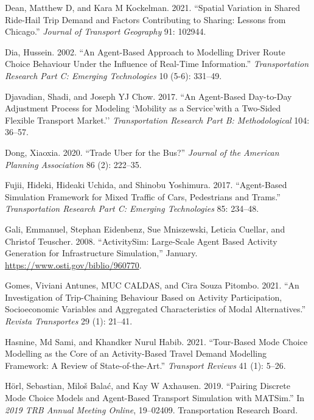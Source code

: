 \documentclass[12pt, oneside, openright]{byuthesis}
\newlength{\cslhangindent}
\newlength{\cslentryspacingunit} %
\newenvironment{CSLReferences}[2] %
 {%
  \setlength{\parindent}{0pt}
  \ifodd #1
  \let\oldpar\par
  \def\par{\hangindent=\cslhangindent\oldpar}
  \fi
  \setlength{\parskip}{#2\cslentryspacingunit}
 }%
 {}
\begin{document}
\begin{CSLReferences}{1}{0}
\leavevmode{}%
Dean, Matthew D, and Kara M Kockelman. 2021. {``Spatial Variation in Shared Ride-Hail Trip Demand and Factors Contributing to Sharing: Lessons from Chicago.''} \emph{Journal of Transport Geography} 91: 102944.

\leavevmode{}%
Dia, Hussein. 2002. {``An Agent-Based Approach to Modelling Driver Route Choice Behaviour Under the Influence of Real-Time Information.''} \emph{Transportation Research Part C: Emerging Technologies} 10 (5-6): 331--49.

\leavevmode{}%
Djavadian, Shadi, and Joseph YJ Chow. 2017. {``An Agent-Based Day-to-Day Adjustment Process for Modeling `Mobility as a Service'with a Two-Sided Flexible Transport Market.''} \emph{Transportation Research Part B: Methodological} 104: 36--57.

\leavevmode{}%
Dong, Xiaoxia. 2020. {``Trade Uber for the Bus?''} \emph{Journal of the American Planning Association} 86 (2): 222--35.

\leavevmode{}%
Fujii, Hideki, Hideaki Uchida, and Shinobu Yoshimura. 2017. {``Agent-Based Simulation Framework for Mixed Traffic of Cars, Pedestrians and Trams.''} \emph{Transportation Research Part C: Emerging Technologies} 85: 234--48.

\leavevmode{}%
Gali, Emmanuel, Stephan Eidenbenz, Sue Mniszewski, Leticia Cuellar, and Christof Teuscher. 2008. {``ActivitySim: Large-Scale Agent Based Activity Generation for Infrastructure Simulation,''} January. \url{https://www.osti.gov/biblio/960770}.

\leavevmode{}%
Gomes, Viviani Antunes, MUC CALDAS, and Cira Souza Pitombo. 2021. {``An Investigation of Trip-Chaining Behaviour Based on Activity Participation, Socioeconomic Variables and Aggregated Characteristics of Modal Alternatives.''} \emph{Revista Transportes} 29 (1): 21--41.

\leavevmode{}%
Hasnine, Md Sami, and Khandker Nurul Habib. 2021. {``Tour-Based Mode Choice Modelling as the Core of an Activity-Based Travel Demand Modelling Framework: A Review of State-of-the-Art.''} \emph{Transport Reviews} 41 (1): 5--26.

\leavevmode{}%
Hörl, Sebastian, Miloš Balać, and Kay W Axhausen. 2019. {``Pairing Discrete Mode Choice Models and Agent-Based Transport Simulation with MATSim.''} In \emph{2019 TRB Annual Meeting Online}, 19--02409. Transportation Research Board.


\end{CSLReferences}
\end{document}
